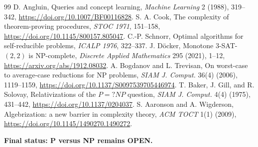 \documentclass[11pt]{article}
\begin{document}
\begin{thebibliography}{99}
 D. Angluin, Queries and concept learning,
\emph{Machine Learning} 2 (1988), 319--342,
\url{https://doi.org/10.1007/BF00116828}.
 S. A. Cook, The complexity of theorem-proving procedures,
\emph{STOC 1971}, 151--158,
\url{https://doi.org/10.1145/800157.805047}.
 C.-P. Schnorr, Optimal algorithms for self-reducible
problems, \emph{ICALP 1976}, 322--337.
 J. D\"ocker, Monotone 3-SAT-\((2,2)\) is NP-complete,
\emph{Discrete Applied Mathematics} 295 (2021), 1--12,
\url{https://arxiv.org/abs/1912.08032}.
 A. Bogdanov and L. Trevisan, On worst-case to average-case
reductions for NP problems, \emph{SIAM J. Comput.} 36(4) (2006), 1119--1159,
\url{https://doi.org/10.1137/S0097539705446974}.
 T. Baker, J. Gill, and R. Solovay, Relativizations of the
\(P=?NP\) question, \emph{SIAM J. Comput.} 4(4) (1975), 431--442,
\url{https://doi.org/10.1137/0204037}.
 S. Aaronson and A. Wigderson, Algebrization: a new barrier in
complexity theory, \emph{ACM TOCT} 1(1) (2009),
\url{https://doi.org/10.1145/1490270.1490272}.
\end{thebibliography}

\bigskip
\noindent\textbf{Final status: P versus NP remains OPEN.}

\end{document}
